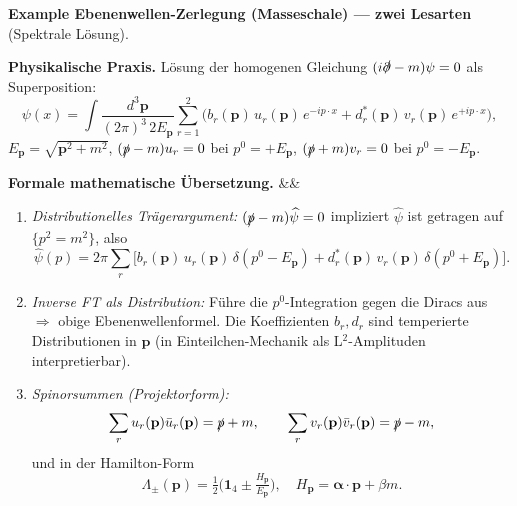\documentclass[10pt, letterpaper]{article}
\newenvironment{romanenum}[1][]
  {%
    \ifx&#1&
    \else
      \textbf{#1}\quad
    \fi
    \begin{enumerate}[label=\roman*)]
  }
  {%
    \end{enumerate}%
  }
\newcommand{\CustomHeading}[3]{%
  \par\medskip\noindent%
  \textbf{#1 #2} \textnormal{(#3)}.\enskip%
}
\newenvironment{EXA}[2]{\begin{unitbox}\CustomHeading{Example}{#1}{#2}}{\end{unitbox}}
\begin{document}
\begin{EXA}{Ebenenwellen-Zerlegung (Masseschale) — zwei Lesarten}{Spektrale Lösung}
\textbf{Physikalische Praxis.}
Lösung der homogenen Gleichung $(i\slashed{\partial}-m)\psi=0$ als Superposition:
\[
\psi(x)=\int\!\frac{d^3\mathbf{p}}{(2\pi)^3\,2E_{\mathbf{p}}}
\sum_{r=1}^{2}\Big(
b_r(\mathbf{p})\,u_r(\mathbf{p})\,e^{-ip\cdot x}
+d_r^*(\mathbf{p})\,v_r(\mathbf{p})\,e^{+ip\cdot x}\Big),
\]
$E_{\mathbf{p}}=\sqrt{\mathbf{p}^2+m^2}$, $(\slashed{p}-m)u_r=0$ bei $p^0=+E_{\mathbf{p}}$,
$(\slashed{p}+m)v_r=0$ bei $p^0=-E_{\mathbf{p}}$.

\medskip
\textbf{Formale mathematische Übersetzung.}
\begin{romanenum}
\item \emph{Distributionelles Trägerargument:} $(\slashed{p}-m)\widehat{\psi}=0$ impliziert
$\widehat{\psi}$ ist getragen auf $\{p^2=m^2\}$, also
\[
\widehat{\psi}(p)=2\pi\sum_{r}
\Big[b_r(\mathbf{p})\,u_r(\mathbf{p})\,\delta(p^0-E_{\mathbf{p}})
+d_r^*(\mathbf{p})\,v_r(\mathbf{p})\,\delta(p^0+E_{\mathbf{p}})\Big].
\]
\item \emph{Inverse FT als Distribution:} Führe die $p^0$-Integration gegen die Diracs aus $\Rightarrow$ obige Ebenenwellenformel. Die Koeffizienten $b_r,d_r$ sind temperierte Distributionen in $\mathbf{p}$ (in Einteilchen-Mechanik als L$^2$-Amplituden interpretierbar).
\item \emph{Spinorsummen (Projektorform):}
\[
\sum_r u_r(\mathbf{p})\bar u_r(\mathbf{p})=\slashed{p}+m,\qquad
\sum_r v_r(\mathbf{p})\bar v_r(\mathbf{p})=\slashed{p}-m,
\]
und in der Hamilton-Form
\[
\Lambda_\pm(\mathbf{p})=\tfrac12\Big(\mathbf{1}_4\pm \tfrac{H_{\mathbf{p}}}{E_{\mathbf{p}}}\Big),\quad
H_{\mathbf{p}}=\boldsymbol{\alpha}\!\cdot\!\mathbf{p}+\beta m.
\]
\end{romanenum}
\end{EXA}


\end{document}
